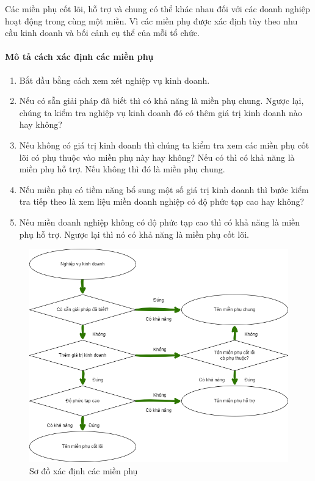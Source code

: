 Các miền phụ cốt lõi, hỗ trợ và chung có thể khác nhau đối với các doanh nghiệp hoạt động trong cùng một miền. Vì các miền phụ được xác định tùy theo nhu cầu kinh doanh và bối cảnh cụ thể của mỗi tổ chức.

\paragraph{Mô tả cách xác định các miền phụ}

\begin{enumerate}

\item Bắt đầu bằng cách xem xét nghiệp vụ kinh doanh.

\item Nếu có sẵn giải pháp đã biết thì có khả năng là miền phụ chung. Ngược lại, chúng ta kiểm tra nghiệp vụ kinh doanh đó có thêm giá trị kinh doanh nào hay không?

\item Nếu không có giá trị kinh doanh thì chúng ta kiểm tra xem các miền phụ cốt lõi có phụ thuộc vào miền phụ này hay không? Nếu có thì có khả năng là miền phụ hỗ trợ. Nếu không thì đó là miền phụ chung.

\item Nếu miền phụ có tiềm năng bổ sung một số giá trị kinh doanh thì bước kiểm tra tiếp theo là xem liệu miền doanh nghiệp có độ phức tạp cao hay không?

\item Nếu miền doanh nghiệp không có độ phức tạp cao thì có khả năng là miền phụ hỗ trợ. Ngược lại thì nó có khả năng là miền phụ cốt lõi.

\end{enumerate}

\begin{figure}[h]

\centering

\includegraphics[scale = 0.5]{pictures/cach_xac_dinh_cac_mien_phu/main.drawio.png}

\caption{Sơ đồ xác định các miền phụ}

\end{figure}
